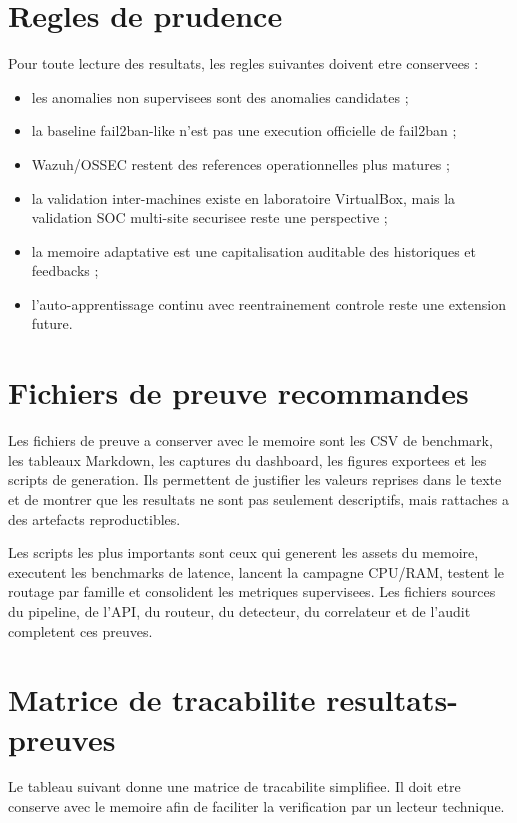 \section{Regles de prudence}
Pour toute lecture des resultats, les regles suivantes doivent etre conservees :
\begin{itemize}
  \item les anomalies non supervisees sont des anomalies candidates ;
  \item la baseline fail2ban-like n'est pas une execution officielle de fail2ban ;
  \item Wazuh/OSSEC restent des references operationnelles plus matures ;
  \item la validation inter-machines existe en laboratoire VirtualBox, mais la validation SOC multi-site securisee reste une perspective ;
  \item la memoire adaptative est une capitalisation auditable des historiques et feedbacks ;
  \item l'auto-apprentissage continu avec reentrainement controle reste une extension future.
\end{itemize}

\section{Fichiers de preuve recommandes}
Les fichiers de preuve a conserver avec le memoire sont les CSV de benchmark, les tableaux Markdown, les captures du dashboard, les figures exportees et les scripts de generation. Ils permettent de justifier les valeurs reprises dans le texte et de montrer que les resultats ne sont pas seulement descriptifs, mais rattaches a des artefacts reproductibles.

Les scripts les plus importants sont ceux qui generent les assets du memoire, executent les benchmarks de latence, lancent la campagne CPU/RAM, testent le routage par famille et consolident les metriques supervisees. Les fichiers sources du pipeline, de l'API, du routeur, du detecteur, du correlateur et de l'audit completent ces preuves.

\section{Matrice de tracabilite resultats-preuves}
Le tableau suivant donne une matrice de tracabilite simplifiee. Il doit etre conserve avec le memoire afin de faciliter la verification par un lecteur technique.


